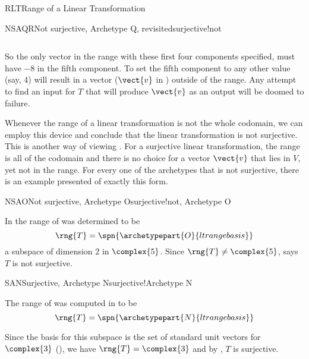 \begin{subsect}{RLT}{Range of a Linear Transformation}
\begin{example}{NSAQR}{Not surjective, Archetype Q, revisited}{surjective!not}
\begin{para}
\begin{equation*}
\end{equation*}
\end{para}
%
\begin{para}So the only vector in the range with these first four components specified, must have $-8$ in the fifth component.  To set the fifth component to any other value (say, 4) will result in a vector ($\vect{v}$ in )  outside of the range.  Any attempt to find an input for $T$ that will produce $\vect{v}$ as an output will be doomed to failure.\end{para}
%
\begin{para}Whenever the range of a linear transformation is not the whole codomain, we can employ this device and conclude that the linear transformation is not surjective.
This is another way of viewing .  For a surjective linear transformation, the range is all of the codomain and there is no choice for a vector $\vect{v}$ that lies in $V$, yet not in the range.  For every one of the archetypes that is not surjective, there is an example presented of exactly this form.\end{para}
%
\end{example}
%
\begin{example}{NSAO}{Not surjective, Archetype O}{surjective!not, Archetype O}
\begin{para}In  the range of  was determined to be
%
\begin{equation*}
\rng{T}=\spn{\archetypepart{O}{ltrangebasis}}\end{equation*}
%
a subspace of dimension 2 in $\complex{5}$.  Since $\rng{T}\neq\complex{5}$,  says $T$ is not surjective.\end{para}
%
\end{example}
%
\begin{example}{SAN}{Surjective, Archetype N}{surjective!Archetype N}
\begin{para}The range of  was computed in  to be
%
\begin{equation*}
\rng{T}=\spn{\archetypepart{N}{ltrangebasis}}\end{equation*}
\end{para}
%
\begin{para}Since the basis for this subspace is the set of standard unit vectors for $\complex{3}$ (), we have $\rng{T}=\complex{3}$ and by , $T$ is  surjective.\end{para}
%
\end{example}
%
%
\end{subsect}
